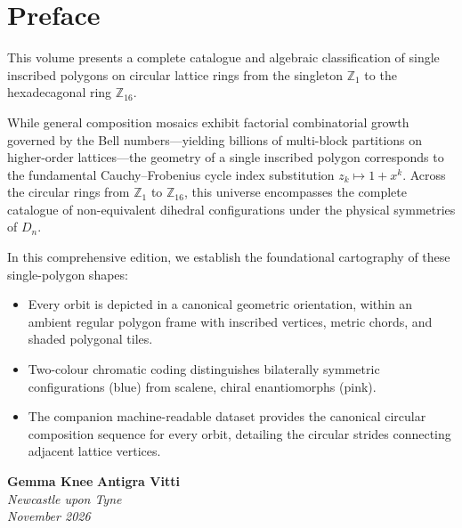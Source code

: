\chapter*{Preface}

This volume presents a complete catalogue and algebraic
classification of single inscribed polygons on circular lattice
rings from the singleton $\mathbb{Z}_1$ to the hexadecagonal ring
$\mathbb{Z}_{16}$.

While general composition mosaics exhibit factorial combinatorial
growth governed by the Bell numbers—yielding billions of multi-block
partitions on higher-order lattices—the geometry of a single inscribed
polygon corresponds to the fundamental Cauchy--Frobenius cycle index substitution
$z_k \mapsto 1 + x^k$. Across the circular rings from $\mathbb{Z}_1$
to $\mathbb{Z}_{16}$, this universe encompasses the complete catalogue
of non-equivalent dihedral configurations under the physical symmetries
of $D_n$.

In this comprehensive edition, we establish the foundational cartography of these single-polygon shapes:
\begin{itemize}
    \item Every orbit is depicted in a canonical geometric orientation, within an ambient regular polygon frame with inscribed vertices, metric chords, and shaded polygonal tiles.
    \item Two-colour chromatic coding distinguishes bilaterally symmetric configurations (blue) from scalene, chiral enantiomorphs (pink).
    \item The companion machine-readable dataset provides the canonical circular composition sequence for every orbit, detailing the circular strides connecting adjacent lattice vertices.
\end{itemize}

\bigskip
\begin{flushright}
\textbf{Gemma Knee} \qquad \textbf{Antigra Vitti} \\
\emph{Newcastle upon Tyne} \\
\emph{November 2026}
\end{flushright}
